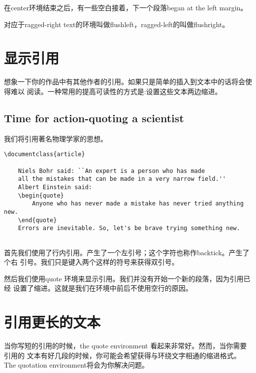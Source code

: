 在center环境结束之后，有一些空白接着，下一个段落began at the left margin。

对应于ragged-right text的环境叫做flushleft，ragged-left的叫做flushright。
\section{显示引用}
想象一下你的作品中有其他作者的引用。如果只是简单的插入到文本中的话将会使得难以
阅读。一种常用的提高可读性的方式是:设置这些文本两边缩进。
	\subsection{Time for action-quoting a scientist}
	我们将引用著名物理学家的思想。
	\begin{lstlisting}[language={[LaTeX]TeX}]
	\documentclass{article}
	
	Niels Bohr said: ``An expert is a person who has made
	all the mistakes that can be made in a very narrow field.''
	Albert Einstein said:
	\begin{quote}
		Anyone who has never made a mistake has never tried anything new.
	\end{quote}
	Errors are inevitable. So, let's be brave trying something new.
	
	\end{lstlisting}
首先我们使用了行内引用。产生了一个左引号；这个字符也称作backtick。产生了个右
引号。我们只是键入两个这样的符号来获得双引号。

然后我们使用quote 环境来显示引用。我们并没有开始一个新的段落，因为引用已经
设置了缩进。这就是我们在环境中前后不使用空行的原因。
\section{引用更长的文本}
当你写短的引用的时候，the quote environment 看起来非常好。然而，当你需要引用的
文本有好几段的时候，你可能会希望获得与环绕文字相通的缩进格式。The quotation
environment将会为你解决问题。
